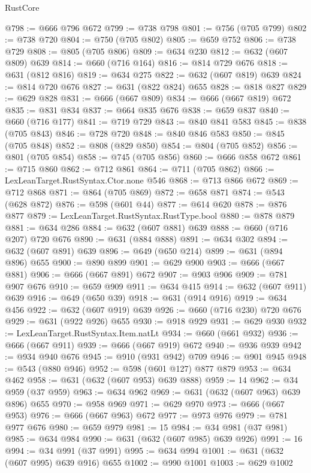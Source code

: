 \begin{lexlean}{RustCore}
\begin{coremodule}
@798 := @666 @796 @672
@799 := @738 @798
@801 := @756 (@705 @799)
@802 := @738 @720
@804 := @750 (@705 @802)
@805 := @659 @752
@806 := @738 @729
@808 := @805 (@705 @806)
@809 := @634 @230
@812 := @632 (@607 @809) @639
@814 := @660 (@716 @164)
@816 := @814 @729 @676
@818 := @631 (@812 @816)
@819 := @634 @275
@822 := @632 (@607 @819) @639
@824 := @814 @720 @676
@827 := @631 (@822 @824) @655
@828 := @818 @827
@829 := @629 @828
@831 := @666 (@667 @809)
@834 := @666 (@667 @819) @672
@835 := @831 @834
@837 := @664 @835 @676
@838 := @659 @837
@840 := @660 (@716 @177)
@841 := @719 @729
@843 := @840 @841 @583
@845 := @838 (@705 @843)
@846 := @728 @720
@848 := @840 @846 @583
@850 := @845 (@705 @848)
@852 := @808 (@829 @850)
@854 := @804 (@705 @852)
@856 := @801 (@705 @854)
@858 := @745 (@705 @856)
@860 := @666 @858 @672
@861 := @715 @860
@862 := @712 @861
@864 := @711 (@705 @862)
@866 := LexLeanTarget.RustSyntax.Ctor.none @546
@868 := @713 @866 @672
@869 := @712 @868
@871 := @864 (@705 @869)
@872 := @658 @871
@874 := @543 (@628 @872)
@876 := @598 (@601 @44)
@877 := @614 @620
@878 := @876 @877
@879 := LexLeanTarget.RustSyntax.RustType.bool
@880 := @878 @879
@881 := @634 @286
@884 := @632 (@607 @881) @639
@888 := @660 (@716 @207) @720 @676
@890 := @631 (@884 @888)
@891 := @634 @302
@894 := @632 (@607 @891) @639
@896 := @649 (@650 @214)
@899 := @631 (@894 @896) @655
@900 := @890 @899
@901 := @629 @900
@903 := @666 (@667 @881)
@906 := @666 (@667 @891) @672
@907 := @903 @906
@909 := @781 @907 @676
@910 := @659 @909
@911 := @634 @415
@914 := @632 (@607 @911) @639
@916 := @649 (@650 @39)
@918 := @631 (@914 @916)
@919 := @634 @456
@922 := @632 (@607 @919) @639
@926 := @660 (@716 @230) @720 @676
@929 := @631 (@922 @926) @655
@930 := @918 @929
@931 := @629 @930
@932 := LexLeanTarget.RustSyntax.Item.natLt
@934 := @660 (@661 @932)
@936 := @666 (@667 @911)
@939 := @666 (@667 @919) @672
@940 := @936 @939
@942 := @934 @940 @676
@945 := @910 (@931 @942) @709
@946 := @901 @945
@948 := @543 (@880 @946)
@952 := @598 (@601 @127) @877 @879
@953 := @634 @462
@958 := @631 (@632 (@607 @953) @639 @888)
@959 := 14
@962 := @34 @959 (@37 @959)
@963 := @634 @962
@969 := @631 (@632 (@607 @963) @639 @896) @655
@970 := @958 @969
@971 := @629 @970
@973 := @666 (@667 @953)
@976 := @666 (@667 @963) @672
@977 := @973 @976
@979 := @781 @977 @676
@980 := @659 @979
@981 := 15
@984 := @34 @981 (@37 @981)
@985 := @634 @984
@990 := @631 (@632 (@607 @985) @639 @926)
@991 := 16
@994 := @34 @991 (@37 @991)
@995 := @634 @994
@1001 := @631 (@632 (@607 @995) @639 @916) @655
@1002 := @990 @1001
@1003 := @629 @1002

\end{coremodule}
\end{lexlean}

